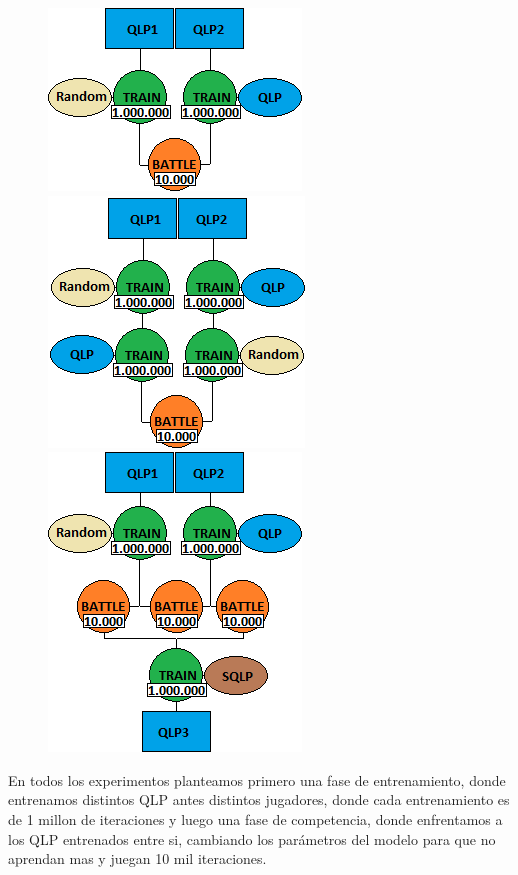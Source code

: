 \documentclass[10pt, a4paper]{article}
\begin{document}
\begin{figure}[H]
  \begin{minipage}[c]{1\textwidth}
    \begin{center}
    \includegraphics[scale=0.5]{E1.png}
    \includegraphics[scale=0.5]{E2.png}
    \includegraphics[scale=0.5]{E3.png}
    \end{center}
  \end{minipage}
\end{figure}

En todos los experimentos planteamos primero una fase de entrenamiento, donde entrenamos distintos QLP antes distintos jugadores, donde cada entrenamiento es de 1 millon de iteraciones y luego una fase de competencia, donde enfrentamos a los QLP entrenados entre si, cambiando los parámetros del modelo para que no aprendan mas y juegan 10 mil iteraciones.
\end{document}
